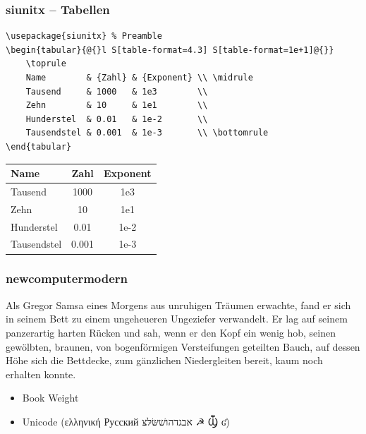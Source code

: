 \documentclass[handout]{beamer}
\begin{document}
\begin{frame}[fragile]
    \frametitle{siunitx -- Tabellen}
    \begin{lstlisting}[basicstyle=\ttfamily\footnotesize]
\usepackage{siunitx} % Preamble
\begin{tabular}{@{}l S[table-format=4.3] S[table-format=1e+1]@{}}
    \toprule
    Name        & {Zahl} & {Exponent} \\ \midrule
    Tausend     & 1000   & 1e3        \\
    Zehn        & 10     & 1e1        \\
    Hunderstel  & 0.01   & 1e-2       \\
    Tausendstel & 0.001  & 1e-3       \\ \bottomrule
\end{tabular}
    \end{lstlisting}
    \vspace*{-1ex}
    \begin{center}
        \begin{tabular}{@{}l S[table-format=4.3] S[table-format=1e+1]@{}}
            \toprule
            Name        & {Zahl} & {Exponent} \\ \midrule
            Tausend     & 1000   & 1e3        \\
            Zehn        & 10     & 1e1        \\
            Hunderstel  & 0.01   & 1e-2       \\
            Tausendstel & 0.001  & 1e-3       \\ \bottomrule
        \end{tabular}
    \end{center}
\end{frame}

\begin{frame}[fragile]
    \frametitle{newcomputermodern}
    \begin{multicols}{2}
        \small{}

        Als Gregor Samsa eines Morgens aus unruhigen Träumen erwachte, fand er sich in seinem Bett zu einem ungeheueren Ungeziefer verwandelt.
        Er lag auf seinem panzerartig harten Rücken und sah, wenn er den Kopf ein wenig hob, seinen gewölbten, braunen, von bogenförmigen Versteifungen geteilten Bauch, auf dessen Höhe sich die Bettdecke, zum gänzlichen Niedergleiten bereit, kaum noch erhalten konnte.
    \end{multicols}
    \begin{itemize}
        \item Book Weight
        \item Unicode (ελληνική Русский אבגדהושׁשּׂלּצּ  ☭ Ⳃ ʛ)
    \end{itemize}
\end{frame}
\end{document}
